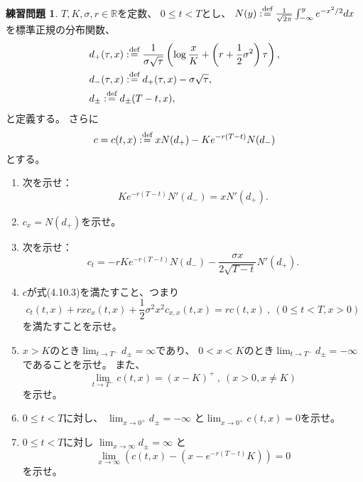 \documentclass[uplatex]{jsarticle}
\theoremstyle{definition}
\newtheorem{prob}[prob]{練習問題}
\def\R{\mathbb{R}}
\def\dfn{:\overset{\mbox{{\scriptsize def}}}{=}}
\begin{document}
\begin{prob}\label{prob: 4.9}
  \( T, K, \sigma, r\in \R\)を定数、
  \(0\leq t < T\)とし、
  \(N(y) \dfn \frac{1}{\sqrt{2\pi}} \int_{-\infty}^ye^{-x^2/2}dx\)
  を標準正規の分布関数、
  \begin{align*}
    &d_+(\tau,x) \dfn
    \frac{1}{\sigma\sqrt{\tau}} \left(
    \log \frac{x}{K} + \left( r + \frac{1}{2}\sigma^2\right) \tau
    \right), \\
    &d_-(\tau,x) \dfn
    d_+(\tau,x) - \sigma\sqrt{\tau}, \\
    &d_{\pm} \dfn d_{\pm}(T-t,x),
  \end{align*}
  と定義する。
  さらに
  \[
  c = c(t,x) \dfn xN(d_+) - Ke^{-r(T-t)}N(d_-)
  \]
  とする。
  \begin{enumerate}
    \item \label{enumi: 4.9-1}
    次を示せ：
    \[
    Ke^{-r(T-t)}N'(d_-) = xN'(d_+).
    \]
    \item \label{enumi: 4.9-2}
    \(c_x = N(d_+)\)を示せ。
    \item \label{enumi: 4.9-3}
    次を示せ：
    \[
    c_t = -rKe^{-r(T-t)}N(d_-) - \frac{\sigma x}{2\sqrt{T-t}}N'(d_+).
    \]
    \item \label{enumi: 4.9-4}
    \(c\)が式(4.10.3)を満たすこと、つまり
    \[
    c_t(t,x) + rxc_x(t,x) + \frac{1}{2}\sigma^2x^2c_{x,x}(t,x)
    = rc(t,x) \ , \ (0\leq t < T , x > 0)
    \]
    を満たすことを示せ。
    \item \label{enumi: 4.9-5}
    \(x > K\)のとき\(\lim_{t\to T^-}d_{\pm} = \infty\)であり、
    \(0 < x < K\)のとき\(\lim_{t\to T^-}d_{\pm} = -\infty\)
    であることを示せ。
    また、
    \[
    \lim_{t\to T^-} c(t,x) = (x-K)^+ \ , \ (x>0, x\neq K)
    \]
    を示せ。
    \item \label{enumi: 4.9-6}
    \(0\leq t < T\)に対し、
    \(\lim_{x\to 0^+}d_{\pm} = -\infty\)
    と\(\lim_{x\to 0^+}c(t,x) = 0\)を示せ。
    \item \label{enumi: 4.9-7}
    \(0\leq t < T\)に対し
    \(\lim_{x\to \infty}d_{\pm} = \infty\)
    と
    \[
    \lim_{x\to \infty}\left( c(t,x) - \left(
    x-e^{-r(T-t)}K\right)\right) = 0
    \]
    を示せ。
  \end{enumerate}
\end{prob}
\end{document}
